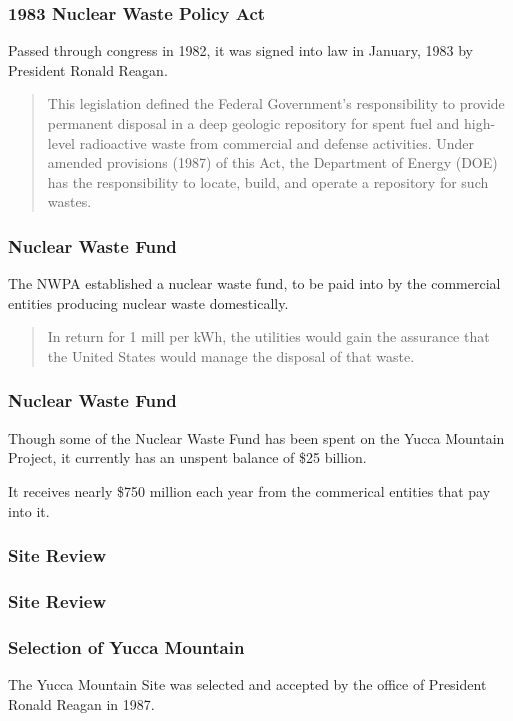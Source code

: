 
\begin{frame}
  \frametitle{1983 Nuclear Waste Policy Act}
  Passed through congress in 1982, it was signed into law in January, 1983 by 
  President Ronald Reagan.


  \begin{quotation}
    This legislation defined the Federal Government’s responsibility to provide 
    permanent disposal in a deep geologic repository for spent fuel and high-level 
    radioactive waste from commercial and defense activities. Under amended 
    provisions (1987)  of this Act, the Department of Energy (DOE) has the 
    responsibility to locate, build, and operate a repository for such wastes. 
    \cite{nrc_backgrounder_2011}
  \end{quotation}

\end{frame}

\begin{frame}
  \frametitle{Nuclear Waste Fund}
  The NWPA established a nuclear waste fund, to be paid into by the commercial 
  entities producing nuclear waste domestically.


  \begin{quotation}
    In return for 1 mill per kWh, the utilities would gain the assurance that 
    the United States would manage the disposal of that waste.
  \end{quotation}

\end{frame}

\begin{frame}
  \frametitle{Nuclear Waste Fund}
  Though some of the Nuclear Waste Fund has been spent on the Yucca Mountain 
  Project, it currently has an unspent balance of \$25 billion. 
  \vspace{1cm}

  It receives nearly \$750 million each year from the commerical entities that 
  pay into it.
\end{frame}


\begin{frame}
  \frametitle{Site Review}
  
\end{frame}

\begin{frame}
  \frametitle{Site Review}
  
\end{frame}

\begin{frame}
  \frametitle{Selection of Yucca Mountain}

  The Yucca Mountain Site was selected and accepted by the office of President 
  Ronald Reagan in 1987. 
  
\end{frame}
